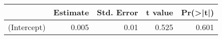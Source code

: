 
\begin{tabular}{l|r|r|r|r}
\hline
  & Estimate & Std. Error & t value & Pr(>|t|)\\
\hline
(Intercept) & 0.005 & 0.01 & 0.525 & 0.601\\
\hline
\end{tabular}
